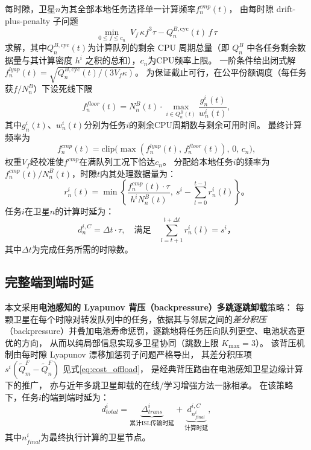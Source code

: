 \documentclass[a4paper,11pt]{article}
\begin{document}
每时隙，卫星$n$为其全部本地任务选择单一计算频率$f^{cmp}_n(t)$，
由每时隙 drift-plus-penalty 子问题
\begin{equation}
    \min_{0 \le f \le c_n}\; V_f\,\kappa f^3\tau - Q^{B,\mathrm{cyc}}_n(t)\,f\,\tau
\end{equation}
求解，其中$Q^{B,\mathrm{cyc}}_n(t)$为计算队列的剩余 CPU 周期总量（即 $Q^B_n$ 中各任务剩余数据量与其计算密度 $h^i$ 之积的总和），$c_n$为CPU频率上限。
一阶条件给出闭式解$f^{lyap}_n(t) = \sqrt{Q^{B,\mathrm{cyc}}_n(t)/(3 V_f \kappa)}$。
为保证截止可行，在公平份额调度（每任务获$f/N^B_n$）下设死线下限
\begin{equation}
    f^{floor}_n(t) = N^B_n(t)\cdot\max_{i \in Q^B_n(t)}
    \frac{g^i_n(t)}{w^i_n(t)},
\end{equation}
其中$g^i_n(t)$、$w^i_n(t)$分别为任务$i$的剩余CPU周期数与剩余可用时间。
最终计算频率为
\begin{equation}
    f^{cmp}_n(t) = \mathrm{clip}\!\big(\max(f^{lyap}_n(t),\, f^{floor}_n(t)),\, 0,\, c_n\big),
    \label{eq:cpu_alloc}
\end{equation}
权重$V_f$经校准使$f^{cmp}$在满队列工况下恰达$c_n$。
分配给本地任务$i$的频率为$f^{cmp}_n(t)/N^B_n(t)$，时隙$t$内其处理数据量为：
\begin{equation}
    r^i_n(t) = \min\!\left\{
    \frac{f^{cmp}_n(t) \cdot \tau}{h^i N^B_n(t)},~
    s^i - \sum_{l=0}^{t-1} r^i_n(l)\right\}。
    \label{eq:workload}
\end{equation}
任务$i$在卫星$n$的计算时延为：
\begin{equation}
    d^{i,C}_n = \Delta t \cdot \tau,\quad
    \text{满足}\quad
    \sum_{l=t+1}^{t+\Delta t} r^i_n(l) = s^i，
    \label{eq:comp_delay}
\end{equation}
其中$\Delta t$为完成任务所需的时隙数。

\subsection{完整端到端时延}

本文采用\textbf{电池感知的 Lyapunov 背压（backpressure）多跳逐跳卸载}策略：
每颗卫星在每个时隙对转发队列中的任务，依据其与邻居之间的\emph{差分积压}
（backpressure）并叠加电池寿命惩罚，逐跳地将任务压向队列更空、电池状态更优的方向，
从而以纯局部信息实现多卫星协同（跳数上限 $K_{\max}=3$）。
该背压机制由每时隙 Lyapunov 漂移加惩罚子问题严格导出，
其差分积压项 $s^i(\tilde{Q}^F_m-\tilde{Q}^F_n)$ 见式\eqref{eq:cost_offload}，
是经典背压路由\cite{tassiulas1992}在电池感知卫星边缘计算下的推广，
亦与近年多跳卫星卸载的在线/学习增强方法\cite{zhang2024mhspo,msndo2025}一脉相承。
在该策略下，任务$i$的端到端时延为：
\begin{equation}
    d^i_{total} =
    \underbrace{\Delta^i_{trans}}_{\text{累计ISL传输时延}}
    + \underbrace{d^{i,C}_{n^i_{final}}}_{\text{计算时延}},
    \label{eq:e2e_delay}
\end{equation}
其中$n^i_{final}$为最终执行计算的卫星节点。
\end{document}
